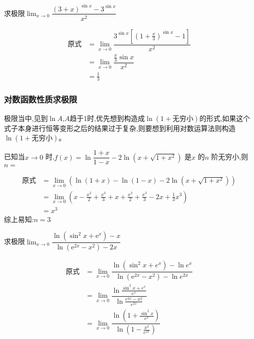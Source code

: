 \documentclass[8pt a4paper, oneside, UTF8]{ctexbook}
\begin{document}
\begin{sloppypar}
\begin{solution}
    \end{solution}
    \begin{problem}
        求极限$\lim_{x\to 0}\dfrac{(3+x)^{\sin x} -3^{\sin x}}{x^2}$
    \end{problem}
    \begin{solution}
        \begin{align*}
          \text{原式} & = \lim_{x\to 0} \dfrac{3^{\sin x}[(1+\frac{x}{3})^{\sin x} -1]}{x^2} \\
          & =  \lim_{x\to 0}\dfrac{\frac{x}{3}\sin x}{x^2} \\
          & = \frac{1}{3}
        \end{align*}
    \end{solution}
    \subsubsection{对数函数性质求极限}
    极限当中,见到$\ln A$,$A$趋于1时,优先想到构造成$\ln(1+\text{无穷小})$的形式,如果这个式子本身进行恒等变形之后的结果过于复杂,则要想到利用对数运算法则构造 $\ln(1+\text{无穷小})$。
    \begin{problem}
        已知当$x\to0$ 时,$f(x)=\ln\dfrac{1+x}{1-x}-2\ln(x+\sqrt{1+x^2})$ 是$x$ 的$n$ 阶无穷小,则$n=$
    \end{problem}
    \begin{solution}
        \begin{align*}
          \text{原式} & =\lim_{x\to 0} (\ln(1+x)-\ln(1-x)-2\ln(x+\sqrt{1+x^2}))\\
          & =  \lim_{x\to0} (x-\frac{x^2}{2}+\frac{x^3}{3}+x+\frac{x^2}{2}+\frac{x^3}{3}-2x+\frac{1}{3}x^3)\\
          & = x^3
        \end{align*}
        综上易知:$n=3$
    \end{solution}
    \begin{problem}
        求极限$\lim_{x\to0}\dfrac{\ln(\sin^2x+\mathrm{e}^x)-x}{\ln(\mathrm{e}^{2x}-x^2)-2x}$
    \end{problem}
    \begin{solution}
        \begin{align*}
            \text{原式} & = \lim_{x\to0}\dfrac{\ln(\sin^2 x+e^x)-\ln e^x}{\ln(\mathrm{e}^{2x}-x^2)-\ln e^{2x}}\\
            & =\lim_{x\to0} \dfrac{\ln \frac{\sin^2 x+e^x}{e^x}}{\ln\frac{e^{2x}-x^2}{e^{2x}}}\\
            & = \lim_{x \to 0} \dfrac{\ln (1+\frac{\sin ^2 x}{e^x})}{\ln (1-\frac{x^2}{e^{2x}})}\\

\end{align*}
\end{solution}
\end{sloppypar}
\end{document}
